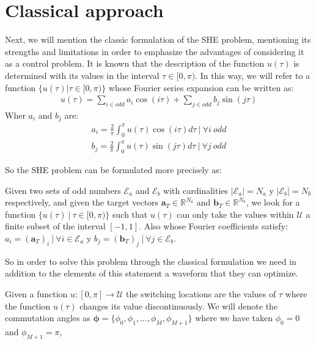 \section{Classical approach}

Next, we will mention the classic formulation of the SHE problem, mentioning its strengths and limitations in order to emphasize the advantages of considering it as a control problem. It is known that the description of the function $ u (\tau) $ is determined with its values in the interval $ \tau \in [0, \pi) $. In this way, we will refer to a function $ \{u (\tau) | \tau \in [0, \pi) \} $ whose Fourier series expansion can be written as:
\begin{gather}
    u(\tau ) = \sum_{i \in odd} a_i \cos(i\tau)+ \sum_{j \in odd}  b_j \sin(j \tau) 
\end{gather}
Wher $a_i$ and $b_j$  are:
\begin{gather}
    a_i = \frac{2}{\pi} \int_0^\pi u(\tau ) \cos(i \tau)d\tau \ | \ \forall i \ odd \label{an}\\
    b_j = \frac{2}{\pi} \int_0^\pi u(\tau)  \sin(j \tau) d\tau \ | \ \forall j \ odd \label{bn}
\end{gather}

So the SHE problem can be formulated more precisely as:

\begin{problem}[SHE]\label{SHEp}
    Given two sets of odd numbers $ \mathcal{E} _a $ and $ \mathcal{E} _b $ with cardinalities $ | \mathcal{E} _a | = N_a $ y $ | \mathcal{E} _b | = N_b $ respectively, 
    and given the target vectors $ \bm {a} _T \in \mathbb {R}^{N_a} $ and $ \bm {b} _T \in \mathbb {R} ^ {N_b} $, we look for a function $ \{u (\tau) \ | \ \tau \in [0, \pi) \} $ such that $ u (\tau) $ can only take the values within $ \mathcal{U} $ a finite subset of the interval $ [- 1,1] $. 
    Also whose Fourier coefficients satisfy: $ a_i = (\bm {a} _T) _i \ | \ \forall i \in \mathcal{E} _a $ y $ b_j = (\bm {b} _T) _j \ | \ \forall j \in \mathcal{E} _b $.
\end{problem}

So in order to solve this problem through the classical formulation we need in addition to the elements of this statement a waveform that they can optimize.

\begin{defi}
    Given a function $ u: [0, \pi] \rightarrow \mathcal{U} $ the switching locations are the values of $ \tau $ where the function $u(\tau)$ changes its value discontinuously. We will denote the commutation angles as $ \bm {\phi} = \{\phi_0, \phi_1, \dots, \phi_M, \phi_ {M + 1} \} $ where we have taken $ \phi_0 = 0 $ and $ \phi_ {M + 1} = \pi $,\end{defi}

